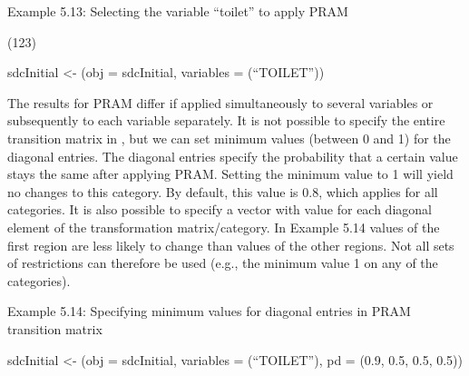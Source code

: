 \documentclass[letterpaper,10pt,english]{sphinxmanual}
\begin{document}
Example 5.13: Selecting the variable “toilet” to apply PRAM

\begin{DUlineblock}{0em}
\item[] 
\item[] (123)
\item[] 
\item[] sdcInitial \textless{}- (obj = sdcInitial, variables = 
(“TOILET”))
\end{DUlineblock}

\begin{DUlineblock}{0em}
\item[] 
\item[] \sphinxcode{\sphinxupquote{\#\# - - - - - - - - - - -}}
\item[] 
\end{DUlineblock}

The results for PRAM differ if applied simultaneously to several
variables or subsequently to each variable separately. It is not
possible to specify the entire transition matrix in , but we
can set minimum values (between 0 and 1) for the diagonal entries. The
diagonal entries specify the probability that a certain value stays the
same after applying PRAM. Setting the minimum value to 1 will yield no
changes to this category. By default, this value is 0.8, which applies
for all categories. It is also possible to specify a vector with value
for each diagonal element of the transformation matrix/category. In
Example 5.14 values of the first region are less likely to change than
values of the other regions.  Not all sets of
restrictions can therefore be used (e.g., the minimum value 1 on any of
the categories).

Example 5.14: Specifying minimum values for diagonal entries in PRAM
transition matrix

sdcInitial \textless{}- (obj = sdcInitial, variables =
(“TOILET”), pd = (0.9, 0.5, 0.5, 0.5))

\begin{DUlineblock}{0em}
\item[] 
\item[] \sphinxcode{\sphinxupquote{\#\# - - - - - - - - - - -}}
\item[] 
\end{DUlineblock}
\end{document}
